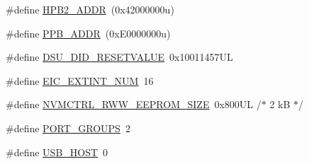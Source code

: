 \begin{DoxyCompactItemize}
\item 
\#define \mbox{\hyperlink{group___s_a_m_d21_g16_l__definitions_gaef42fa53ddf169a2a50be70d29f73571}{H\+P\+B2\+\_\+\+A\+D\+DR}}~(0x42000000u)
\item 
\#define \mbox{\hyperlink{group___s_a_m_d21_g16_l__definitions_ga8895d0a3a9a3126cc44330f86c8ce564}{P\+P\+B\+\_\+\+A\+D\+DR}}~(0x\+E0000000u)
\item 
\#define \mbox{\hyperlink{group___s_a_m_d21_g16_l__definitions_gada75131d542c9e1966238f5488f89bd6}{D\+S\+U\+\_\+\+D\+I\+D\+\_\+\+R\+E\+S\+E\+T\+V\+A\+L\+UE}}~0x10011457\+UL
\item 
\#define \mbox{\hyperlink{group___s_a_m_d21_g16_l__definitions_ga88ebc38c95506296f5d21f82476296ae}{E\+I\+C\+\_\+\+E\+X\+T\+I\+N\+T\+\_\+\+N\+UM}}~16
\item 
\#define \mbox{\hyperlink{group___s_a_m_d21_g16_l__definitions_gacb7a115808eeb0b50bd55888f9ba65ae}{N\+V\+M\+C\+T\+R\+L\+\_\+\+R\+W\+W\+\_\+\+E\+E\+P\+R\+O\+M\+\_\+\+S\+I\+ZE}}~0x800\+U\+L /$\ast$ 2 k\+B $\ast$/
\item 
\#define \mbox{\hyperlink{group___s_a_m_d21_g16_l__definitions_gab9243ffe03a1dc631b57a495b4b3d467}{P\+O\+R\+T\+\_\+\+G\+R\+O\+U\+PS}}~2
\item 
\#define \mbox{\hyperlink{group___s_a_m_d21_g16_l__definitions_ga856aa08fb33114928cbc8635be1792e4}{U\+S\+B\+\_\+\+H\+O\+ST}}~0
\end{DoxyCompactItemize}
